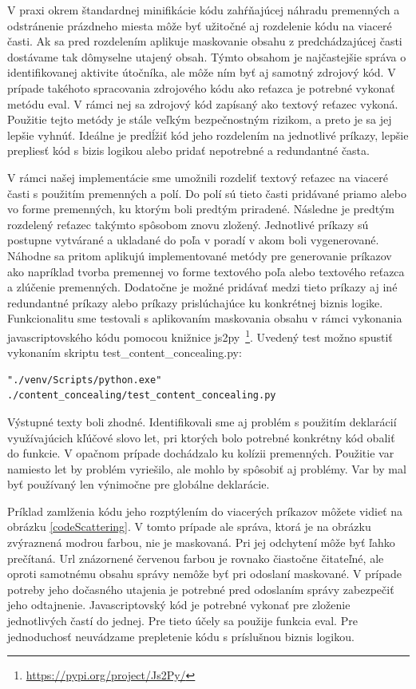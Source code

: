 \documentclass[conference, 11pt,slovak,a4paper,twoside]{IEEEtran}
\begin{document}
V praxi okrem štandardnej minifikácie kódu zahŕňajúcej náhradu premenných a odstránenie prázdneho miesta môže byť užitočné aj rozdelenie kódu na viaceré časti. Ak sa pred rozdelením aplikuje maskovanie obsahu z predchádzajúcej časti dostávame tak dômyselne utajený obsah. Týmto obsahom je najčastejšie správa o identifikovanej aktivite útočníka, ale môže ním byť aj samotný zdrojový kód. V prípade takéhoto spracovania zdrojového kódu ako reťazca je potrebné vykonať metódu eval. V rámci nej sa zdrojový kód zapísaný ako textový reťazec vykoná. Použitie tejto metódy je stále veľkým bezpečnostným rizikom, a preto je sa jej lepšie vyhnúť. Ideálne je predĺžiť kód jeho rozdelením na jednotlivé príkazy, lepšie prepliesť kód s bizis logikou alebo pridať nepotrebné a redundantné časta.

V rámci našej implementácie sme umožnili rozdeliť textový reťazec na viaceré časti s použitím premenných a polí. Do polí sú tieto časti pridávané priamo alebo vo forme premenných, ku ktorým boli predtým priradené. Následne je predtým rozdelený reťazec takýmto spôsobom znovu zložený. Jednotlivé príkazy sú postupne vytvárané a ukladané do poľa v poradí v akom boli vygenerované. Náhodne sa pritom aplikujú implementované metódy pre generovanie príkazov ako napríklad tvorba premennej vo forme textového poľa alebo textového reťazca a zlúčenie premenných. Dodatočne je možné pridávať medzi tieto príkazy aj iné redundantné príkazy alebo príkazy prislúchajúce ku konkrétnej biznis logike. Funkcionalitu sme testovali s aplikovaním maskovania obsahu v rámci vykonania javascriptovského kódu pomocou knižnice js2py~\footnote{\url{https://pypi.org/project/Js2Py/}}. Uvedený test možno spustiť vykonaním skriptu test\_content\_concealing.py:

\begin{lstlisting}
"./venv/Scripts/python.exe" ./content_concealing/test_content_concealing.py
\end{lstlisting}


Výstupné texty boli zhodné. Identifikovali sme aj problém s použitím deklarácií využívajúcich kľúčové slovo let, pri ktorých bolo potrebné konkrétny kód obaliť do funkcie. V opačnom prípade dochádzalo ku kolízii premenných. Použitie var namiesto let by problém vyriešilo, ale mohlo by spôsobiť aj problémy. Var by mal byť používaný len výnimočne pre globálne deklarácie. 

Príklad zamlženia kódu jeho rozptýlením do viacerých príkazov môžete vidieť na obrázku \ref{codeScattering}. V tomto prípade ale správa, ktorá je na obrázku zvýraznená modrou farbou, nie je maskovaná. Pri jej odchytení môže byť ľahko prečítaná. Url znázornené červenou farbou je rovnako čiastočne čitateľné, ale oproti samotnému obsahu správy nemôže byť pri odoslaní maskované. V prípade potreby jeho dočasného utajenia je potrebné pred odoslaním správy zabezpečiť jeho odtajnenie. Javascriptovský kód je potrebné vykonať pre zloženie jednotlivých častí do jednej. Pre tieto účely sa použije funkcia eval. Pre jednoduchosť neuvádzame prepletenie kódu s príslušnou biznis logikou.
\end{document}
